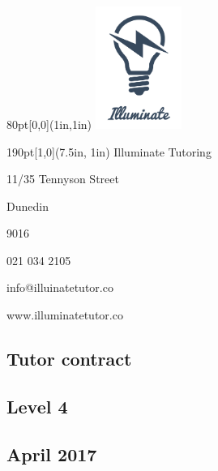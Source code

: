 \documentclass[10pt]{article}
\begin{document}
\begin{textblock*}{80pt}[0,0](1in,1in)
  \includegraphics[width=80pt]{titlePic}
\end{textblock*}

\begin{flushright}
  \begin{textblock*}{190pt}[1,0](7.5in, 1in)
    Illuminate Tutoring

    11/35 Tennyson Street

    Dunedin

    9016

    021 034 2105

    info@illuinatetutor.co

    www.illuminatetutor.co
  \end{textblock*}
\end{flushright}

\vspace*{12cm}

\begin{center}
  \section*{Tutor contract}
  \subsection*{Level 4}
  \subsection*{April 2017}
\end{center}

\clearpage
\end{document}
